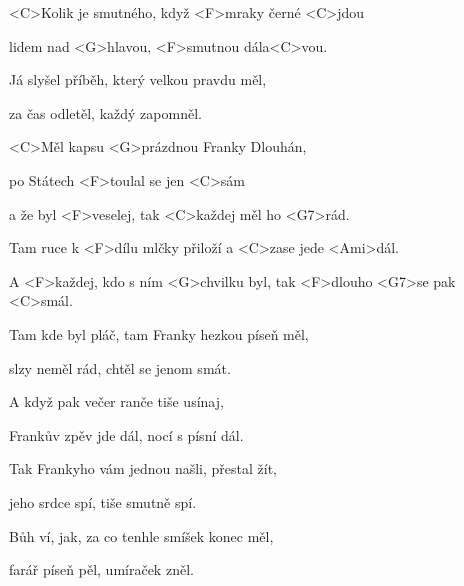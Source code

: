 

\zs
<C>Kolik je smutného,
když <F>mraky černé <C>jdou

lidem nad <G>hlavou, <F>smutnou dála<C>vou.

Já slyšel příběh, který velkou pravdu měl,

za čas odletěl, každý zapomněl.
\ks

\zr
<C>Měl kapsu <G>prázdnou Franky Dlouhán,

po Státech <F>toulal se jen <C>sám

a že byl <F>veselej, tak <C>každej měl ho <G7>rád.

Tam ruce k <F>dílu mlčky přiloží
a <C>zase
jede <Ami>dál.

A <F>každej, kdo s ním
<G>chvilku byl, tak <F>dlouho <G7>se pak <C>smál.
\kr

\zs
Tam kde byl pláč, tam Franky hezkou píseň měl,

slzy neměl rád, chtěl se jenom smát.

A když pak večer ranče tiše usínaj,

Frankův zpěv jde dál, nocí s písní dál.
\ks

\zr \kr

\zs
Tak Frankyho vám jednou našli, přestal žít,

jeho srdce spí, tiše smutně spí.

Bůh ví, jak, za co tenhle smíšek konec měl,

farář píseň pěl, umíraček zněl.
\ks
\kp









